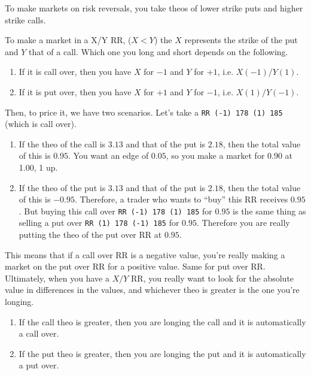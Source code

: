 \documentclass{article}
\begin{document}
    To make markets on risk reversals, you take theos of lower strike puts and higher strike calls. 

    \begin{example}
      To make a market in a X/Y RR, ($X < Y$) the $X$ represents the strike of the put and $Y$ that of a call. Which one you long and short depends on the following. 
      \begin{enumerate}
        \item If it is call over, then you have $X$ for $-1$ and $Y$ for $+1$, i.e. $X (-1) / Y (1)$. 
        \item If it is put over, then you have $X$ for $+1$ and $Y$ for $-1$, i.e. $X (1) / Y (-1)$. 
      \end{enumerate}
      Then, to price it, we have two scenarios. Let's take a \texttt{RR (-1) 178 (1) 185} (which is call over).  
      \begin{enumerate}
        \item If the theo of the call is $3.13$ and that of the put is $2.18$, then the total value of this is $0.95$. You want an edge of $0.05$, so you make a market for 0.90 at 1.00, 1 up. 

        \item If the theo of the put is $3.13$ and that of the put is $2.18$, then the total value of this is $-0.95$. Therefore, a trader who wants to ``buy'' this RR receives $0.95$. But buying this call over \texttt{RR (-1) 178 (1) 185} for $0.95$ is the same thing as selling a put over \texttt{RR (1) 178 (-1) 185} for $0.95$. Therefore you are really putting the theo of the put over RR at $0.95$. 
      \end{enumerate}
    \end{example}

    This means that if a call over RR is a negative value, you're really making a market on the put over RR for a positive value. Same for put over RR. Ultimately, when you have a $X/Y$ RR, you really want to look for the absolute value in differences in the values, and whichever theo is greater is the one you're longing. 
    \begin{enumerate}
      \item If the call theo is greater, then you are longing the call and it is automatically a call over. 
      \item If the put theo is greater, then you are longing the put and it is automatically a put over. 
    \end{enumerate}
\end{document}
